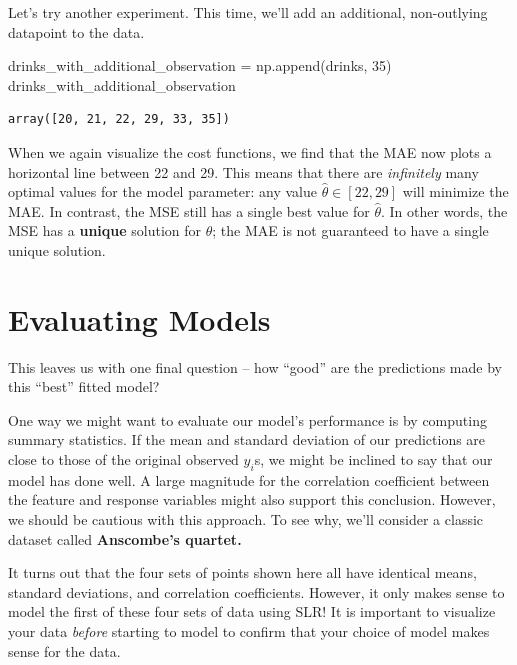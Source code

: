 \documentclass[
  letterpaper,
  DIV=11,
  numbers=noendperiod]{scrreprt}
\newenvironment{Shaded}{\begin{snugshade}}{\end{snugshade}}
\newcommand{\DecValTok}[1]{\textcolor[rgb]{0.68,0.00,0.00}{#1}}
\newcommand{\NormalTok}[1]{\textcolor[rgb]{0.00,0.23,0.31}{#1}}
\newcommand{\OperatorTok}[1]{\textcolor[rgb]{0.37,0.37,0.37}{#1}}
\begin{document}
Let's try another experiment. This time, we'll add an additional,
non-outlying datapoint to the data.

\begin{Shaded}
\begin{Highlighting}[]
\NormalTok{drinks\_with\_additional\_observation }\OperatorTok{=}\NormalTok{ np.append(drinks, }\DecValTok{35}\NormalTok{)}
\NormalTok{drinks\_with\_additional\_observation}
\end{Highlighting}
\end{Shaded}

\begin{verbatim}
array([20, 21, 22, 29, 33, 35])
\end{verbatim}

When we again visualize the cost functions, we find that the MAE now
plots a horizontal line between 22 and 29. This means that there are
\emph{infinitely} many optimal values for the model parameter: any value
\(\hat{\theta} \in [22, 29]\) will minimize the MAE. In contrast, the
MSE still has a single best value for \(\hat{\theta}\). In other words,
the MSE has a \textbf{unique} solution for \(\hat{\theta}\); the MAE is
not guaranteed to have a single unique solution.

\hypertarget{evaluating-models}{%
\section{Evaluating Models}\label{evaluating-models}}

This leaves us with one final question -- how ``good'' are the
predictions made by this ``best'' fitted model?

One way we might want to evaluate our model's performance is by
computing summary statistics. If the mean and standard deviation of our
predictions are close to those of the original observed \(y_i\)s, we
might be inclined to say that our model has done well. A large magnitude
for the correlation coefficient between the feature and response
variables might also support this conclusion. However, we should be
cautious with this approach. To see why, we'll consider a classic
dataset called \textbf{Anscombe's quartet.}

It turns out that the four sets of points shown here all have identical
means, standard deviations, and correlation coefficients. However, it
only makes sense to model the first of these four sets of data using
SLR! It is important to visualize your data \emph{before} starting to
model to confirm that your choice of model makes sense for the data.
\end{document}
